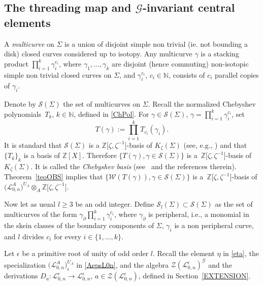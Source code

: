 \documentclass[pdftex]{sigma}%
\numberwithin{equation}{section}
\numberwithin{figure}{section}
\newcommand{\e}{\epsilon}
\newcommand{\mz}{\mathbb{Z}}
\newcommand{\Gg}{{\mathcal G}}
\newcommand{\Ll}{{\mathcal L}}
\newcommand{\ra}{\rightarrow}
\begin{document}
\subsection[The threading map and G-invariant central elements]{The threading map and $\boldsymbol{\Gg}$-invariant central elements}

A {\it multicurve} on $\Sigma$ is a union of disjoint simple non trivial (ie. not bounding a disk) closed curves considered up to isotopy. Any multicurve $\gamma$ is a stacking product $\textstyle \prod_{i=1}^k \gamma_i^{c_i}$, where $\gamma_1,\dots,\gamma_k$ are disjoint (hence commuting) non-isotopic simple non trivial closed curves on $\Sigma$, and $\gamma_i^{c_i}$, $c_i\in \mathbb{N}$, consists of $c_i$ parallel copies of $\gamma_i$.

Denote by $\mathcal{S}(\Sigma)$ the set of multicurves on $\Sigma$. Recall the normalized Chebyshev polynomials~$T_k$, $k\in \mathbb{N}$, defined in \eqref{ChPol}. For $\gamma\in \mathcal{S}(\Sigma)$, $\gamma = \prod_{i=1}^k \gamma_i^{c_i}$, set
\[
T(\gamma):= \prod_{i=1}^k T_{c_i}(\gamma_i).
\]
It is standard that $\mathcal{S}(\Sigma)$ is a $\mz\big[\zeta,\zeta^{-1}\big]$-basis of $K_\zeta(\Sigma)$ (see, e.g., \cite[Theorem~7]{PS}) and that~$\{T_k\}_k$ is a basis of $\mz[X]$. Therefore $\{T(\gamma), \gamma\in \mathcal{S}(\Sigma)\}$ is a~$\mz\big[\zeta,\zeta^{-1}\big]$-basis of $K_\zeta(\Sigma)$. It is called the {\it Chebyshev basis} (see~\cite{FKL2} and the references therein). Theorem~\ref{teoOBS} implies that $\{\mathcal{W}(T(\gamma)), \gamma\in\mathcal{S}(\Sigma)\}$ is a~$\mz\big[\zeta,\zeta^{-1}\big]$-basis of $\big(\Ll_{0,n}^A\big)^{U_A}\otimes_A \mz\big[\zeta,\zeta^{-1}\big]$.

Now let as usual $l\geq 3$ be an odd integer. Define $\mathcal{S}_l(\Sigma)\subset \mathcal{S}(\Sigma)$ as the set of multicurves of the form $\gamma_\partial\prod_{i=1}^k \gamma_i^{c_i}$, where $\gamma_\partial$ is peripheral, i.e., a monomial in the skein classes of the boundary components of $\Sigma$, $\gamma_i$ is a non peripheral curve, and $l$ divides $c_i$ for every $i\in \{1,\dots,k\}$.

Let $\epsilon$ be a primitive root of unity of odd order $l$. Recall the element $\eta$ in \eqref{eta}, the specialization $\big(\Ll_{0,n}^A\big)^{U_A}_\e$ in \eqref{AepsL0n}, and the algebra $\mathcal{Z}(\Ll_{0,n}^\e)^\Gg$ and the derivations $D_a\colon \Ll_{0,n}^\e \ra \Ll_{0,n}^\e$, $a\in \mathcal{Z}(\Ll_{0,n}^\e)$, defined in Section~\ref{EXTENSION}.
\end{document}
